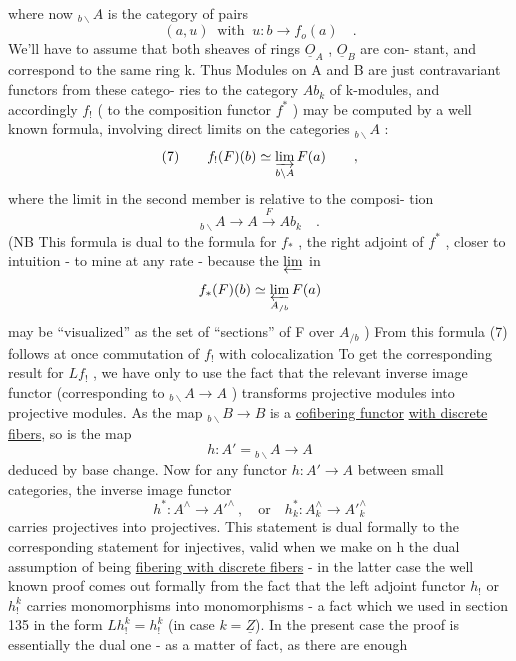
where now ${}_{b\backslash}A$  is the category of pairs
\[ (a,u) \ \text{ with } \ u: b \to f_{o}(a) \quad . \]
We'll have to assume  that both sheaves of rings $\underline{O}_A$ , $\underline{O}_B$  are con-%
stant,  and correspond to the same ring k.   Thus
Modules on A and B are just contravariant functors from these catego-%
ries to the category  $Ab_k$  of  k-modules,  and accordingly $f_!$
( to the composition functor $f^*$ )  may be computed by a well known
formula,  involving direct limits on the categories ${}_{b\backslash}A$ :
\[ (7) \qquad f_!(F)(b) \simeq \varinjlim_{b\backslash A} F(a) \qquad , \]
where the limit in the second member is relative to the  composi-%
tion
\[ {}_{b\backslash}A \longrightarrow A \xrightarrow{\ F\ } Ab_k \quad . \]
(NB This formula is dual to the formula for $f_*$ ,  the right adjoint of
$f^*$ ,  closer to intuition  - to mine at any rate -  because the $\varprojlim$ in
\[ f_*(F)(b) \simeq \varprojlim_{A_{/b}} F(a) \]
may be ``visualized'' as   the  set of ``sections'' of
F over $A_{/b}$ ) From this formula (7) follows at once commutation of
$f_!$  with colocalization  To get the corresponding result for $Lf_!$ ,
we have only to use the fact that the relevant inverse image functor
(corresponding to  ${}_{b\backslash}A \to A$ ) transforms projective modules into
projective modules.  As the map  ${}_{b\backslash}B \longrightarrow B$  is a \uline{cofibering functor}
\uline{with discrete fibers},  so is the map
\[ h: A' = {}_{b\backslash}A \longrightarrow A \]
deduced by base change.  Now for any  functor  $h: A' \to A$ between small
categories,  the inverse image functor
\[ h^* : A^{\wedge} \longrightarrow A'^{\wedge} \ , \quad \text{or} \quad h^*_k : A^{\wedge}_k \to A'^{\wedge}_k \]
carries  projectives into projectives.  This statement is dual formally
to the corresponding statement for injectives,  valid when we make on
h the dual assumption of being \uline{fibering with discrete fibers}  -  in the
latter case the \hand{(}well known\hand{)} proof comes out formally from the fact
that the left adjoint functor $h_!$ or $h^k_!$ carries monomorphisms into
monomorphisms   -  a fact which we used in section 135
in the form  $Lh^k_! = h^k_!$ (in case $k=\underline{Z}$).  In the present case the proof is
essentially the dual one  -  as a matter of fact, as there are enough

